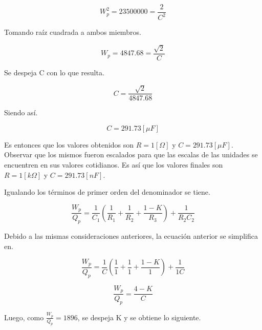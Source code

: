 \documentclass[12pt,A4paper,titlepage]{article}
\begin{document}
\begin{equation}
    W_p^2= 23 500 000 = \frac{2}{C^2}
\end{equation}

\bigskip
\hspace{1mm} Tomando raíz cuadrada a ambos miembros.

\begin{equation}
    W_p = 4 847.68 = \frac{\sqrt{2}}{C}
\end{equation}

\bigskip
\hspace{1mm} Se despeja C con lo que resulta.

\begin{equation}
    C = \frac{\sqrt{2}}{4 847.68}
\end{equation}

\hspace{1mm} Siendo así.

\begin{equation}
    C = 291.73 [\mu F]
\end{equation}

\bigskip
\hspace{1mm} Es entonces que los valores obtenidos son \(R=1 [\Omega]\) y \(C = 291.73 [\mu F]\). Observar que los mismos fueron escalados para que las escalas de las unidades se encuentren en sus valores cotidianos. Es así que los valores finales son \(R = 1 [k\Omega]\) y \(C = 291.73 [nF]\).

\newpage
\hspace{1mm} Igualando los términos de primer orden del denominador se tiene.

\begin{equation}
    \frac{W_p}{Q_p} = \frac{1}{C_1}(\frac{1}{R_1} + \frac{1}{R_2} + \frac{1-K}{R_3}) + \frac{1}{R_2 C_2}
\end{equation}

\bigskip
\hspace{1mm} Debido a las mismas consideraciones anteriores, la ecuación anterior se simplifica en.

\begin{equation}
    \frac{W_p}{Q_p} = \frac{1}{C}(\frac{1}{1} + \frac{1}{1} + \frac{1-K}{1}) + \frac{1}{1 C}
\end{equation}

\begin{equation}
    \frac{W_p}{Q_p} = \frac{4-K}{C}
\end{equation}

\hspace{1mm} Luego, como \(\frac{W_p}{Q_p} = 1 896\), se despeja K y se obtiene lo siguiente.
\end{document}
